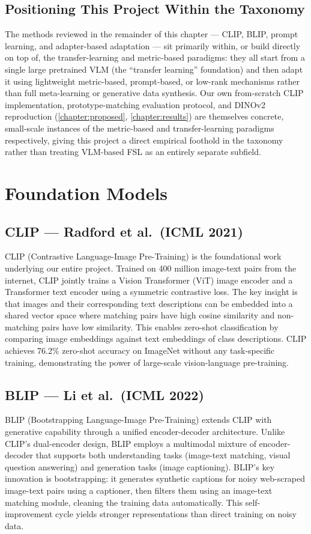 \documentclass{iutbscthesis}
\begin{document}
\subsection{Positioning This Project Within the Taxonomy}
The methods reviewed in the remainder of this chapter --- CLIP, BLIP, prompt learning, and adapter-based adaptation --- sit primarily within, or build directly on top of, the transfer-learning and metric-based paradigms: they all start from a single large pretrained VLM (the ``transfer learning'' foundation) and then adapt it using lightweight metric-based, prompt-based, or low-rank mechanisms rather than full meta-learning or generative data synthesis. Our own from-scratch CLIP implementation, prototype-matching evaluation protocol, and DINOv2 reproduction (\autoref{chapter:proposed}, \autoref{chapter:results}) are themselves concrete, small-scale instances of the metric-based and transfer-learning paradigms respectively, giving this project a direct empirical foothold in the taxonomy rather than treating VLM-based FSL as an entirely separate subfield.

\section{Foundation Models}

\subsection{CLIP --- Radford et al.\ (ICML 2021)}
CLIP (Contrastive Language-Image Pre-Training) \cite{radford2021clip} is the foundational work underlying our entire project. Trained on 400 million image-text pairs from the internet, CLIP jointly trains a Vision Transformer (ViT) image encoder and a Transformer text encoder using a symmetric contrastive loss. The key insight is that images and their corresponding text descriptions can be embedded into a shared vector space where matching pairs have high cosine similarity and non-matching pairs have low similarity. This enables zero-shot classification by comparing image embeddings against text embeddings of class descriptions. CLIP achieves 76.2\% zero-shot accuracy on ImageNet without any task-specific training, demonstrating the power of large-scale vision-language pre-training.

\subsection{BLIP --- Li et al.\ (ICML 2022)}
BLIP (Bootstrapping Language-Image Pre-Training) \cite{li2022blip} extends CLIP with generative capability through a unified encoder-decoder architecture. Unlike CLIP's dual-encoder design, BLIP employs a multimodal mixture of encoder-decoder that supports both understanding tasks (image-text matching, visual question answering) and generation tasks (image captioning). BLIP's key innovation is bootstrapping: it generates synthetic captions for noisy web-scraped image-text pairs using a captioner, then filters them using an image-text matching module, cleaning the training data automatically. This self-improvement cycle yields stronger representations than direct training on noisy data.
\end{document}
